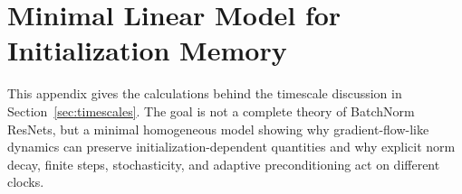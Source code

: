 \documentclass{article}
\newcommand{\Acc}{\mathrm{Acc}}
\newcommand{\sigw}{\sigma_w}
\newcommand{\taubest}{\tau_{\mathrm{best}}}
\begin{document}
\section{Minimal Linear Model for Initialization Memory}
\label{app:toy_model}

This appendix gives the calculations behind the timescale discussion in
Section~\ref{sec:timescales}.  The goal is not a complete theory of
BatchNorm ResNets, but a minimal homogeneous model showing why
gradient-flow-like dynamics can preserve initialization-dependent
quantities and why explicit norm decay, finite steps, stochasticity, and
adaptive preconditioning act on different clocks.
\end{document}
